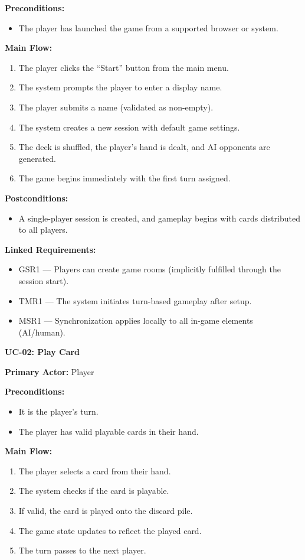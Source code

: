 \documentclass[12pt]{article}
\begin{document}
\textbf{Preconditions:}
\begin{itemize}
    \item The player has launched the game from a supported browser or system.
\end{itemize}

\textbf{Main Flow:}
\begin{enumerate}
    \item The player clicks the “Start” button from the main menu.
    \item The system prompts the player to enter a display name.
    \item The player submits a name (validated as non-empty).
    \item The system creates a new session with default game settings.
    \item The deck is shuffled, the player’s hand is dealt, and AI opponents are generated.
    \item The game begins immediately with the first turn assigned.
\end{enumerate}

\textbf{Postconditions:}
\begin{itemize}
    \item A single-player session is created, and gameplay begins with cards distributed to all players.
\end{itemize}

\textbf{Linked Requirements:} 
\begin{itemize}
    \item GSR1 — Players can create game rooms (implicitly fulfilled through the session start).
    \item TMR1 — The system initiates turn-based gameplay after setup.
    \item MSR1 — Synchronization applies locally to all in-game elements (AI/human).
\end{itemize}


\vspace{0.5cm}
\textbf{UC-02: Play Card}

\textbf{Primary Actor:} Player

\textbf{Preconditions:}
\begin{itemize}
    \item It is the player’s turn.
    \item The player has valid playable cards in their hand.
\end{itemize}

\textbf{Main Flow:}
\begin{enumerate}
    \item The player selects a card from their hand.
    \item The system checks if the card is playable.
    \item If valid, the card is played onto the discard pile.
    \item The game state updates to reflect the played card.
    \item The turn passes to the next player.
\end{enumerate}
\end{document}
